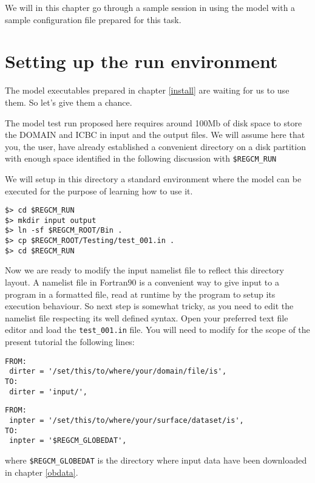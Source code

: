 %
%

We will in this chapter go through a sample session in using the model with
a sample configuration file prepared for this task.

\section{Setting up the run environment}

The model executables prepared in chapter \ref{install} are waiting for us to
use them. So let's give them a chance.

The model test run proposed here requires around 100Mb of disk space to store
the DOMAIN and ICBC in input and the output files. We will assume here that you,
the user, have already established a convenient directory on a disk partition
with enough space identified in the following discussion with \verb=$REGCM_RUN=

We will setup in this directory a standard environment where the model can be
executed for the purpose of learning how to use it.

\begin{Verbatim}
$> cd $REGCM_RUN
$> mkdir input output
$> ln -sf $REGCM_ROOT/Bin .
$> cp $REGCM_ROOT/Testing/test_001.in .
$> cd $REGCM_RUN
\end{Verbatim}

Now we are ready to modify the input namelist file to reflect this directory
layout. A namelist file in Fortran90 is a convenient way to give input to a
program in a formatted file, read at runtime by the program to setup its
execution behaviour. So next step is somewhat tricky, as you need to edit
the namelist file respecting its well defined syntax. Open your preferred text
file editor and load the \verb=test_001.in= file. You will need to modify for
the scope of the present tutorial the following lines:

\begin{Verbatim}
FROM:
 dirter = '/set/this/to/where/your/domain/file/is',
TO:
 dirter = 'input/',
\end{Verbatim}

\begin{Verbatim}
FROM:
 inpter = '/set/this/to/where/your/surface/dataset/is',
TO:
 inpter = '$REGCM_GLOBEDAT',
\end{Verbatim}

where \verb=$REGCM_GLOBEDAT= is the directory where input data have been
downloaded in chapter \ref{obdata}.

